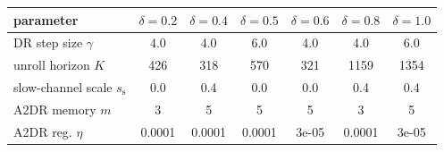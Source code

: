 
\begin{tabular}{lcccccc}
\toprule
parameter & $\delta=0.2$ & $\delta=0.4$ & $\delta=0.5$ & $\delta=0.6$ & $\delta=0.8$ & $\delta=1.0$ \\
\midrule
DR step size $\gamma$ & 4.0 & 4.0 & 6.0 & 4.0 & 4.0 & 6.0 \\
unroll horizon $K$ & 426 & 318 & 570 & 321 & 1159 & 1354 \\
slow-channel scale $s_{\mathrm s}$ & 0.0 & 0.4 & 0.0 & 0.0 & 0.4 & 0.4 \\
A2DR memory $m$ & 3 & 5 & 5 & 5 & 3 & 5 \\
A2DR reg. $\eta$ & 0.0001 & 0.0001 & 0.0001 & 3e-05 & 0.0001 & 3e-05 \\
\bottomrule
\end{tabular}
